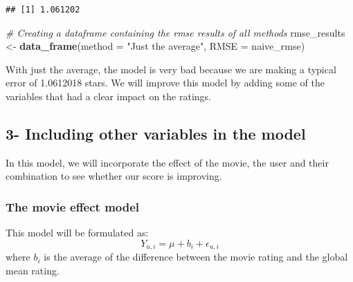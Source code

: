 \documentclass[]{article}
\newenvironment{Shaded}{\begin{snugshade}}{\end{snugshade}}
\newcommand{\KeywordTok}[1]{\textcolor[rgb]{0.13,0.29,0.53}{\textbf{#1}}}
\newcommand{\DataTypeTok}[1]{\textcolor[rgb]{0.13,0.29,0.53}{#1}}
\newcommand{\StringTok}[1]{\textcolor[rgb]{0.31,0.60,0.02}{#1}}
\newcommand{\CommentTok}[1]{\textcolor[rgb]{0.56,0.35,0.01}{\textit{#1}}}
\newcommand{\OperatorTok}[1]{\textcolor[rgb]{0.81,0.36,0.00}{\textbf{#1}}}
\newcommand{\NormalTok}[1]{#1}
\begin{document}
\begin{verbatim}
## [1] 1.061202
\end{verbatim}

\begin{Shaded}
\begin{Highlighting}[]
\CommentTok{# Creating a dataframe containing the rmse results of all methods}
\NormalTok{rmse_results <-}\StringTok{ }\KeywordTok{data_frame}\NormalTok{(}\DataTypeTok{method =} \StringTok{"Just the average"}\NormalTok{, }\DataTypeTok{RMSE =}\NormalTok{ naive_rmse)}
\end{Highlighting}
\end{Shaded}

With just the average, the model is very bad because we are making a
typical error of 1.0612018 stars. We will improve this model by adding
some of the variables that had a clear impact on the ratings.

\subsection{3- Including other variables in the
model}\label{including-other-variables-in-the-model}

In this model, we will incorporate the effect of the movie, the user and
their combination to see whether our score is improving.

\subsubsection{The movie effect model}\label{the-movie-effect-model}

This model will be formulated as:
\[ Y_{u,i} = \mu + b_i + \epsilon_{u,i} \] where \(b_i\) is the average
of the difference between the movie rating and the global mean rating.

\begin{Shaded}
\end{Shaded}
\end{document}
